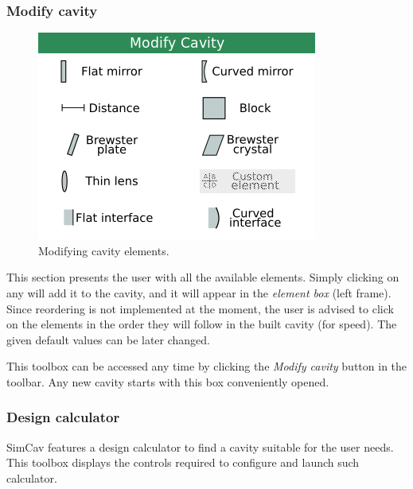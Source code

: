 \documentclass[11pt,a4paper,article,oneside]{memoir}
\begin{document}
			\subsubsection{Modify cavity}
			\begin{figure}
				\normalcaptionwidth
				\vspace{-12pt}
				\centering
				\includegraphics[width=\linewidth]{modify-box.png}
				\caption[Modify cavity]{Modifying cavity elements.}
				\label{fig:modify-box}
			\end{figure}
		
			This section presents the user with all the available elements. Simply clicking on any will add it to the cavity, and it will appear in the \textit{element box} (left frame). Since reordering is not implemented at the moment, the user is advised to click on the elements in the order they will follow in the built cavity (for speed). The given default values can be later changed.
			
			This toolbox can be accessed any time by clicking the \textit{Modify cavity} button in the toolbar. Any new cavity starts with this box conveniently opened.
		
			\subsubsection{Design calculator}
			SimCav features a design calculator to find a cavity suitable for the user needs. This toolbox displays the controls required to configure and launch such calculator.
			
\end{document}
